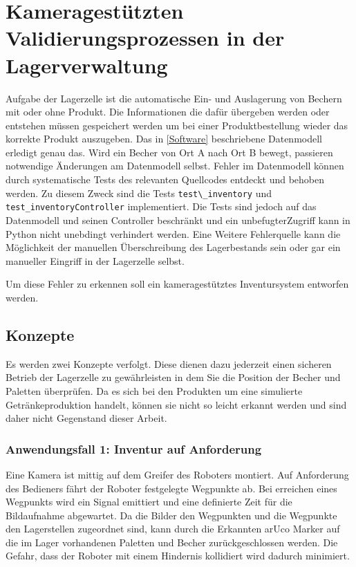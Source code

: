 \chapter{Kameragestützten Validierungsprozessen in der Lagerverwaltung}\label{KameragestützteInventur}

Aufgabe der Lagerzelle ist die automatische Ein- und Auslagerung von Bechern mit oder ohne Produkt.
Die Informationen die dafür übergeben werden oder entstehen müssen gespeichert werden um bei einer Produktbestellung wieder das korrekte Produkt auszugeben.
Das in \ref{Software} beschriebene Datenmodell erledigt genau das. Wird ein Becher von Ort A nach Ort B bewegt, 
passieren notwendige Änderungen am Datenmodell selbst. Fehler im Datenmodell können durch systematische Tests des relevanten Quellcodes entdeckt und behoben werden. 
Zu diesem Zweck sind die Tests \verb|test\_inventory| und \verb|test_inventoryController| implementiert. 
Die Tests sind jedoch auf das Datenmodell und seinen Controller beschränkt und ein \glq unbefugter\grq Zugriff kann in Python nicht unebdingt verhindert werden. 
Eine Weitere Fehlerquelle kann die Möglichkeit der manuellen Überschreibung des Lagerbestands sein oder gar ein manueller Eingriff in der Lagerzelle selbst. 

Um diese Fehler zu erkennen soll ein kameragestütztes Inventursystem entworfen werden. 
    \section {Konzepte}

    Es werden zwei Konzepte verfolgt.
    Diese dienen dazu jederzeit einen sicheren Betrieb der Lagerzelle zu gewährleisten in dem Sie die Position der Becher und Paletten überprüfen.
    Da es sich bei den Produkten um eine simulierte Getränkeproduktion handelt, können sie nicht so leicht erkannt werden und sind daher nicht Gegenstand dieser Arbeit. 

    \subsection{Anwendungsfall 1: Inventur auf Anforderung}\label{InventurAufAnforderung}

    Eine Kamera ist mittig auf dem Greifer des Roboters montiert. Auf Anforderung des Bedieners fährt der Roboter festgelegte Wegpunkte ab. 
    Bei erreichen eines Wegpunkts wird ein Signal emittiert und eine definierte Zeit für die Bildaufnahme abgewartet.
    Da die Bilder den Wegpunkten und die Wegpunkte den Lagerstellen zugeordnet sind, kann durch die Erkannten arUco Marker auf die 
    im Lager vorhandenen Paletten und Becher zurückgeschlossen werden. 
    Die Gefahr, dass der Roboter mit einem Hindernis kollidiert wird dadurch minimiert. 


